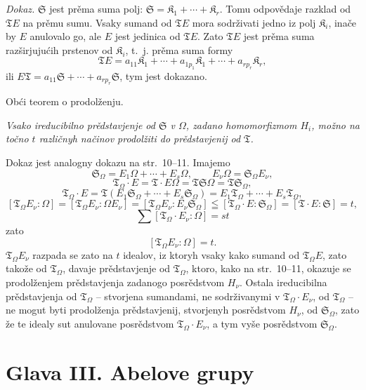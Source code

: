 \documentclass[11pt]{article}
\begin{document}
\emph{Dokaz.} \(\mathfrak S\) jest prěma suma polj: \(\mathfrak S=\mathfrak K_1+\cdots+\mathfrak K_r\). Tomu odpovědaje razklad od \(\mathfrak T E\) na prěmu sumu. Vsaky sumand od \(\mathfrak T E\) mora sodrživati jedno iz polj \(\mathfrak K_i\), inače by \(E\) anulovalo go, ale \(E\) jest jedinica od \(\mathfrak T E\). Zato \(\mathfrak T E\) jest prěma suma razširjujućih prstenov od \(\mathfrak K_i\), t.~j. prěma suma formy
\[
\mathfrak T E=a_{11}\mathfrak K_1+\cdots+a_{1p_1}\mathfrak K_1+\cdots+a_{rp_r}\mathfrak K_r,
\]
ili \(E\mathfrak T=a_{11}\mathfrak S+\cdots+a_{rp_r}\mathfrak S\), tym jest dokazano.

\begin{center}
Obći teorem o prodolženju.
\end{center}

\emph{Vsako ireducibilno prědstavjenje od \(\mathfrak S\) v \(\Omega\), zadano homomorfizmom \(H_i\), možno na točno \(t\) različnyh načinov prodolžiti do prědstavjenij od \(\mathfrak T\).}

Dokaz jest analogny dokazu na str.~10--11. Imajemo
\[
\mathfrak S_\Omega=E_1\Omega+\cdots+E_s\Omega,\qquad
E_\nu\Omega=\mathfrak S_\Omega E_\nu,
\]
\[
\mathfrak T_\Omega\cdot E=\mathfrak T\cdot E\Omega
=\mathfrak T\mathfrak S\Omega=\mathfrak T\mathfrak S_\Omega,
\]
\[
\mathfrak T_\Omega\cdot E
=\mathfrak T(E_1\mathfrak S_\Omega+\cdots+E_s\mathfrak S_\Omega)
=E_1\mathfrak T_\Omega+\cdots+E_s\mathfrak T_\Omega,
\]
\[
[\mathfrak T_\Omega E_\nu:\Omega]
=[\mathfrak T_\Omega E_\nu:\Omega E_\nu]
=[\mathfrak T_\Omega E_\nu:E_\nu\mathfrak S_\Omega]
\leqq[\mathfrak T_\Omega\cdot E:\mathfrak S_\Omega]
=[\mathfrak T\cdot E:\mathfrak S]=t,
\]
\[
\sum[\mathfrak T_\Omega\cdot E_\nu:\Omega]=st
\]
zato
\[
[\mathfrak T_\Omega E_\nu:\Omega]=t.
\]
\(\mathfrak T_\Omega E_\nu\) razpada se zato na \(t\) idealov, iz ktoryh vsaky kako sumand od \(\mathfrak T_\Omega E\), zato takože od \(\mathfrak T_\Omega\), davaje prědstavjenje od \(\mathfrak T_\Omega\), ktoro, kako na str.~10--11, okazuje se prodolženjem prědstavjenja zadanogo posrědstvom \(H_\nu\). Ostala ireducibilna prědstavjenja od \(\mathfrak T_\Omega\) -- stvorjena sumandami, ne sodrživanymi v \(\mathfrak T_\Omega\cdot E_\nu\), od \(\mathfrak T_\Omega\) -- ne mogut byti prodolženja prědstavjenij, stvorjenyh posrědstvom \(H_\nu\), od \(\mathfrak S_\Omega\), zato že te idealy sut anulovane posrědstvom \(\mathfrak T_\Omega\cdot E_\nu\), a tym vyše posrědstvom \(\mathfrak S_\Omega\).

\section*{Glava III. Abelove grupy}\label{kapitel-iii.-abelsche-gruppen}
\end{document}
